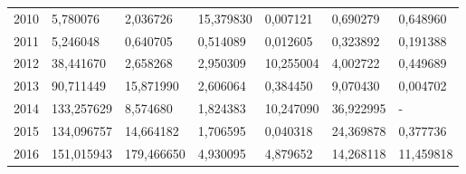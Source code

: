 \begin{table}
\begin{tabular}{p{1cm}p{2cm}p{2cm}p{2cm}p{2cm}p{2cm}p{2cm}}
 2010 &                         5,780076 &                                     2,036726 &                       15,379830 &  0,007121 &             0,690279 &                      0,648960 \\
 2011 &                         5,246048 &                                     0,640705 &                        0,514089 &  0,012605 &             0,323892 &                      0,191388 \\
 2012 &                        38,441670 &                                     2,658268 &                        2,950309 & 10,255004 &             4,002722 &                      0,449689 \\
 2013 &                        90,711449 &                                    15,871990 &                        2,606064 &  0,384450 &             9,070430 &                      0,004702 \\
 2014 &                       133,257629 &                                     8,574680 &                        1,824383 & 10,247090 &            36,922995 &                             - \\
 2015 &                       134,096757 &                                    14,664182 &                        1,706595 &  0,040318 &            24,369878 &                      0,377736 \\
 2016 &                       151,015943 &                                   179,466650 &                        4,930095 &  4,879652 &            14,268118 &                     11,459818 \\
\bottomrule
\end{tabular}
\end{table}
